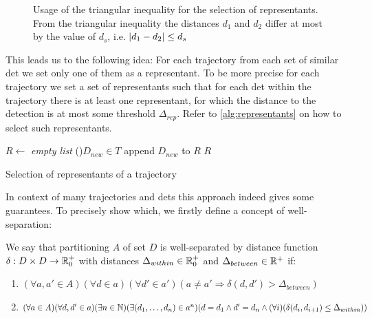 \begin{figure}
    \centering
    \Large
    \def\svgwidth{\columnwidth}
    \scalebox{0.6}{}
    \caption[Usage of triangular inequality for the selection of representants]{Usage of the triangular inequality for the selection of representants. From the triangular inequality the distances $d_1$ and $d_2$ differ at most by the value of $d_s$, i.e. $\left|{d_1 - d_2}\right| \leq d_s$}
    \label{fig:triangular}
\end{figure}

This leads us to the following idea: For each trajectory from each set of similar \gls{det} we set only one of them as a representant. To be more precise for each trajectory we set a set of representants such that for each \gls{det} within the trajectory there is at least one representant, for which the distance to the detection is at most some threshold $\Delta_{rep}$. Refer to \autoref{alg:representants} on how to select such representants.

\begin{algorithm}

 
 \BlankLine
 $R \leftarrow$ \emph{empty list}\;
 \For(){$D_{new} \in T$}{
  append $D_{new}$ to $R$\;
 }
 \Return $R$
 \caption{Selection of representants of a trajectory}
 \label{alg:representants}
\end{algorithm}

In context of many trajectories and \glspl{det} this approach indeed gives some guarantees. To precisely show which, we firstly define a concept of well-separation:

\begin{defn}
\label{defn:well_sep}
We say that partitioning $A$ of set $D$ is well-separated by distance function $\delta: D \times D \rightarrow \mathbb{R}_0^+$ with distances $\Delta_{within} \in \mathbb{R}_0^+$ and $\Delta_{between} \in \mathbb{R}^+$ if:
\begin{enumerate}[label=(\roman*)]
    \item $(\forall a, a' \in A) (\forall d \in a) (\forall d' \in a') (a \neq a' \Rightarrow \delta(d, d') > \Delta_{between})$ \label{item:between}
    \item $(\forall a \in A)(\forall d, d' \in a) (\exists n \in \mathbb{N}) (\exists (d_1, \ldots, d_n) \in a^n) (d = d_1 \land d' = d_n \land (\forall i) (\delta(d_i, d_{i+1}) \leq \Delta_{within}))$ \label{item:within}
\end{enumerate}
\end{defn}

